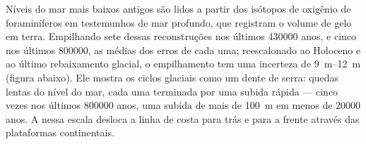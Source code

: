 Níveis do mar mais baixos antigos são lidos a partir dos isótopos de oxigênio de foraminíferos
em testemunhos de mar profundo, que registram o volume de gelo em terra. Empilhando sete dessas
reconstruções nos últimos \num{430000} anos, e cinco nos últimos \num{800000}, as médias dos
erros de cada uma; reescalonado ao Holoceno e ao último rebaixamento glacial, o empilhamento
tem uma incerteza de \qtyrange{9}{12}{m} (figura abaixo). Ele mostra os ciclos glaciais como
um dente de serra: quedas lentas do nível do mar, cada uma terminada por uma subida rápida ---
cinco vezes nos últimos \num{800000} anos, uma subida de mais de \qty{100}{m} em menos de
\num{20000} anos. A  nessa escala desloca a linha de costa para trás e para a frente
através das plataformas continentais.

